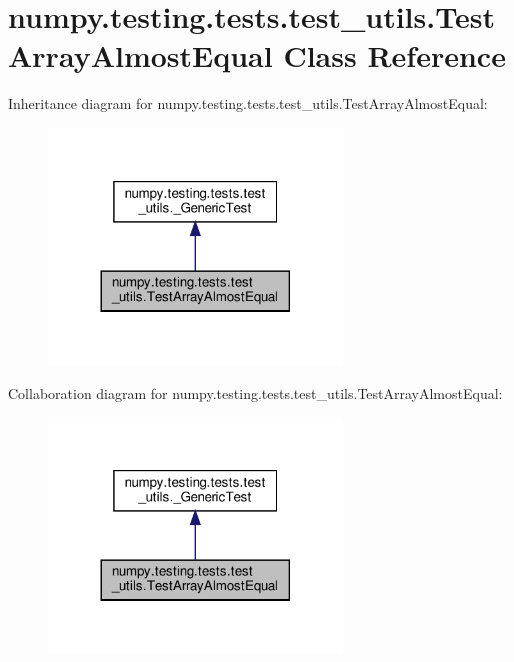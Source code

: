 \hypertarget{classnumpy_1_1testing_1_1tests_1_1test__utils_1_1TestArrayAlmostEqual}{}\section{numpy.\+testing.\+tests.\+test\+\_\+utils.\+Test\+Array\+Almost\+Equal Class Reference}
\label{classnumpy_1_1testing_1_1tests_1_1test__utils_1_1TestArrayAlmostEqual}


Inheritance diagram for numpy.\+testing.\+tests.\+test\+\_\+utils.\+Test\+Array\+Almost\+Equal\+:
\nopagebreak
\begin{figure}[H]
\begin{center}
\leavevmode
\includegraphics[width=221pt]{classnumpy_1_1testing_1_1tests_1_1test__utils_1_1TestArrayAlmostEqual__inherit__graph}
\end{center}
\end{figure}


Collaboration diagram for numpy.\+testing.\+tests.\+test\+\_\+utils.\+Test\+Array\+Almost\+Equal\+:
\nopagebreak
\begin{figure}[H]
\begin{center}
\leavevmode
\includegraphics[width=221pt]{classnumpy_1_1testing_1_1tests_1_1test__utils_1_1TestArrayAlmostEqual__coll__graph}
\end{center}
\end{figure}
